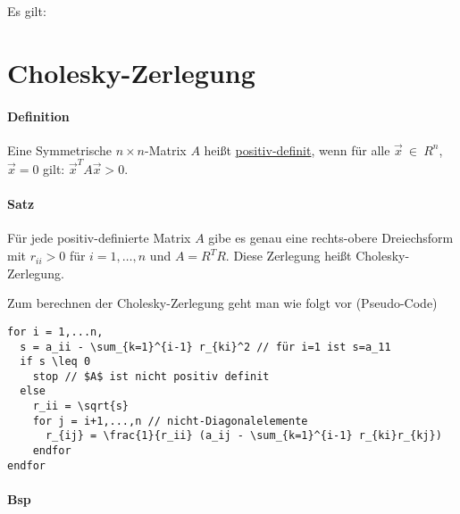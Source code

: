 \documentclass[a4paper,ngerman]{scrbook}
\begin{document}
Es gilt: 

\section{Cholesky-Zerlegung}
\label{sec:chorlesky}

\paragraph{Definition}

Eine Symmetrische $n \times n$-Matrix $A$ heißt \underline{positiv-definit}, wenn für alle $\vec{x}~\in~R^n$, $\vec{x} = 0$ gilt: $\vec{x}^{T} A \vec{x} > 0$.

\paragraph{Satz}

Für jede positiv-definierte Matrix $A$ gibe es genau eine rechts-obere Dreiechsform mit $r_{ii} > 0$ für $i=1,\dots,n$ und $A=R^{T}R$. Diese Zerlegung heißt Cholesky-Zerlegung.

Zum berechnen der Cholesky-Zerlegung geht man wie folgt vor (Pseudo-Code)


\begin{verbatim}
for i = 1,...n,
  s = a_ii - \sum_{k=1}^{i-1} r_{ki}^2 // für i=1 ist s=a_11
  if s \leq 0
    stop // $A$ ist nicht positiv definit
  else
    r_ii = \sqrt{s}
    for j = i+1,...,n // nicht-Diagonalelemente
      r_{ij} = \frac{1}{r_ii} (a_ij - \sum_{k=1}^{i-1} r_{ki}r_{kj})
    endfor
endfor
\end{verbatim}

\paragraph{Bsp}
\end{document}

